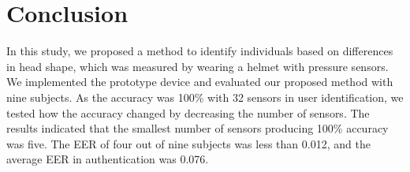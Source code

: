 \documentclass[sigconf,authordraft]{acmart}
\begin{document}
\section{Conclusion}
\label{sec:conclusion}
In this study, we proposed a method to identify individuals based on differences in head shape, which was measured by wearing a helmet with pressure sensors. We implemented the prototype device and evaluated our proposed method with nine subjects.
As the accuracy was 100\% with 32 sensors in user identification, we tested how the accuracy changed by decreasing the number of sensors. The results indicated that the smallest number of sensors producing 100\% accuracy was five. The EER of four out of nine subjects was less than 0.012, and the average EER in authentication was 0.076.










\end{document}
